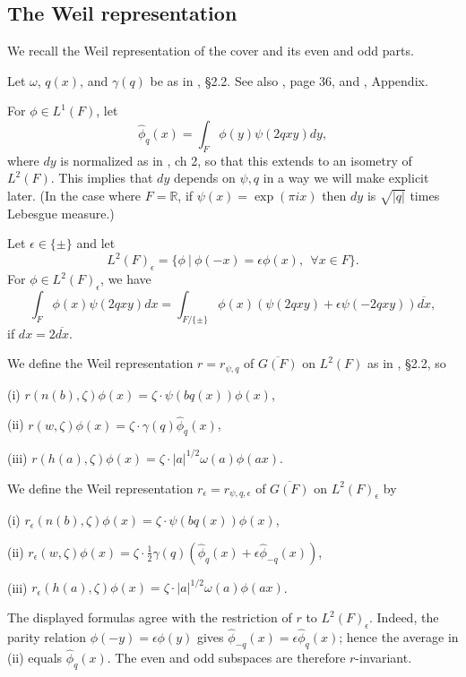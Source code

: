 \documentclass[12pt,letterpaper,openany]{book}
\theoremstyle{plain}
\theoremstyle{definition}
\theoremstyle{remark}
\theoremstyle{remark}
\begin{document}
\subsection{The Weil representation}\label{sec:weil-rep}

We recall the Weil representation of the cover and its even and odd parts.


Let $\omega$, $q(x)$, and $\gamma(q)$ be as in \cite{Fl}, \S 2.2. See also
\cite{Ge2}, page 36, and \cite{Rao}, Appendix.

For $\phi \in L^1(F)$, let
\[
\hat{\phi}_q(x)=\int_F \phi(y)\psi(2qxy)dy,
\]
where $dy$ is normalized as in \cite{Ge2}, ch 2, so that this extends to
an isometry of $L^2(F)$. This implies that $dy$ depends on $\psi, q$
in a way we will make explicit later.
(In the case where $F={\mathbb{R}}$, if $\psi(x)=\exp(\pi i x)$ then
$dy$ is $\sqrt{|q|}$ times Lebesgue measure.)

Let $\epsilon \in \{\pm\}$ and let
\[
L^2(F)_\epsilon=
\{\phi \ |\ \phi(-x)=\epsilon \phi(x),\ \ \forall x\in F\}.
\]
For $\phi\in L^2(F)_\epsilon$, we have
\[
\int_F \phi(x)\psi(2qxy)dx =
\int_{F/\{\pm \}}
\phi(x) (\psi(2qxy)+\epsilon \psi(-2qxy))\overline{dx},
\]
if $dx=2\overline{dx}$.

We define the Weil representation $r=r_{\psi,q}$ of
$\overline{G(F)}$ on $L^2(F)$ as in \cite{Fl}, \S 2.2, so

(i) $r(n(b),\zeta)\phi(x)=\zeta\cdot \psi(bq(x))\phi(x)$,

(ii) $r(w,\zeta)\phi(x)
=\zeta\cdot \gamma(q)\hat{\phi}_q(x)$,

(iii) $r(h(a),\zeta)\phi(x)=\zeta\cdot |a|^{1/2}\omega(a)\phi(ax)$.

We define the Weil representation $r_\epsilon=r_{\psi,q,\epsilon}$ of
$\overline{G(F)}$ on $L^2(F)_\epsilon$ by

(i) $r_\epsilon(n(b),\zeta)\phi(x)=\zeta\cdot \psi(bq(x))\phi(x)$,

(ii) $r_\epsilon(w,\zeta)\phi(x)
=\zeta\cdot {\frac{1}{2}}\gamma(q)(\hat{\phi}_q(x)
+\epsilon \hat{\phi}_{-q}(x))$,

(iii) $r_\epsilon(h(a),\zeta)\phi(x)=\zeta\cdot |a|^{1/2}\omega(a)\phi(ax)$.

The displayed formulas agree with the restriction of $r$ to
$L^2(F)_\epsilon$. Indeed, the parity relation
$\phi(-y)=\epsilon\phi(y)$ gives
$\widehat\phi_{-q}(x)=\epsilon\widehat\phi_q(x)$; hence the average
in (ii) equals $\widehat\phi_q(x)$.
The even and odd subspaces are therefore $r$-invariant.
\end{document}
